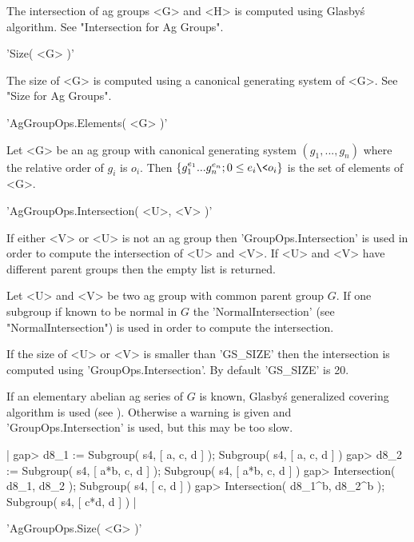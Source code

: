 The intersection of ag  groups <G> and  <H>  is computed using  Glasby\'s
algorithm. See "Intersection for Ag Groups".

\vspace{5mm}
'Size( <G> )'%

The size of <G> is computed using a  canonical generating  system of <G>.
See "Size for Ag Groups".


'AgGroupOps.Elements( <G> )'

Let <G> be an ag group with canonical generating system $(g_1, ..., g_n)$
where the  relative order  of  $g_i$ is  $o_i$.   Then  $\{ g_1^{e_1} ...
g_n^{e_n} ; 0 \leq e_i \< o_i \}$ is the set of elements of <G>.


'AgGroupOps.Intersection( <U>, <V> )'

If either <V> or  <U> is not an ag  group then 'GroupOps.Intersection' is
used in order to compute the intersection of <U> and <V>.  If <U> and <V>
have different parent groups then the empty list is returned.

Let <U>  and <V> be two ag  group with common  parent group $G$.   If one
subgroup if known   to be normal  in $G$  the  'NormalIntersection'  (see
"NormalIntersection") is used in order to compute the intersection.

If   the  size of   <U>  or <V>   is smaller  than   'GS\_SIZE' then  the
intersection   is computed   using  'GroupOps.Intersection'. By   default
'GS\_SIZE' is 20.

If an elementary abelian ag series of $G$ is known, Glasby\'s generalized
covering algorithm is  used  (see  \cite{GS90}).   Otherwise a warning is
given and 'GroupOps.Intersection' is used, but this may be too slow.

|    gap> d8_1 := Subgroup( s4, [ a, c, d ] );
    Subgroup( s4, [ a, c, d ] )
    gap> d8_2 := Subgroup( s4, [ a*b, c, d ] );
    Subgroup( s4, [ a*b, c, d ] )
    gap> Intersection( d8_1, d8_2 );
    Subgroup( s4, [ c, d ] )
    gap> Intersection( d8_1^b, d8_2^b );
    Subgroup( s4, [ c*d, d ] ) |


'AgGroupOps.Size( <G> )'

